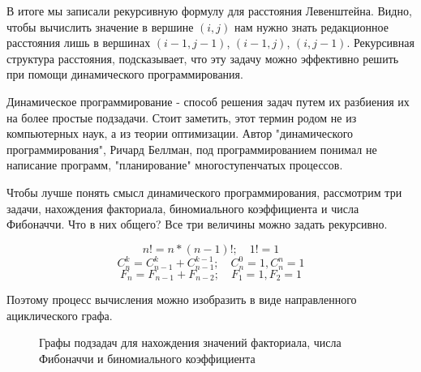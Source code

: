 \documentclass[letterpaper, 11pt]{article}
\begin{document}
В итоге мы записали рекурсивную формулу для расстояния Левенштейна. Видно, чтобы вычислить значение в вершине $(i,j)$ нам нужно знать редакционное расстояния лишь в вершинах $(i-1,j-1)$, $(i-1,j)$, $(i,j-1)$.
Рекурсивная структура расстояния, подсказывает, что эту задачу можно эффективно решить при помощи динамического программирования.

Динамическое программирование - способ решения задач путем их разбиения их на более простые подзадачи. Стоит заметить, этот термин родом не из компьютерных наук, а из теории оптимизации. Автор "динамического программирования", Ричард Беллман, под программированием понимал не написание программ, "планирование" многоступенчатых процессов.

Чтобы лучше понять смысл динамического программирования, рассмотрим три задачи, нахождения факториала, биномиального коэффициента и числа Фибоначчи. Что в них общего? Все три величины можно задать рекурсивно.

$$n!=n*(n-1)!;\quad 1!=1$$
$$C^k_n=C^k_{n-1} + C^{k-1}_{n-1};\quad C^0_n=1, C^n_n=1$$
$$F_n=F_{n-1}+F_{n-2};\quad F_1=1, F_2=1$$

Поэтому процесс вычисления можно изобразить в виде направленного ациклического графа.

\begin{figure}[H]
  \caption{Графы подзадач для нахождения значений факториала, числа Фибоначчи и биномиального коэффициента}
\end{figure}
\end{document}
